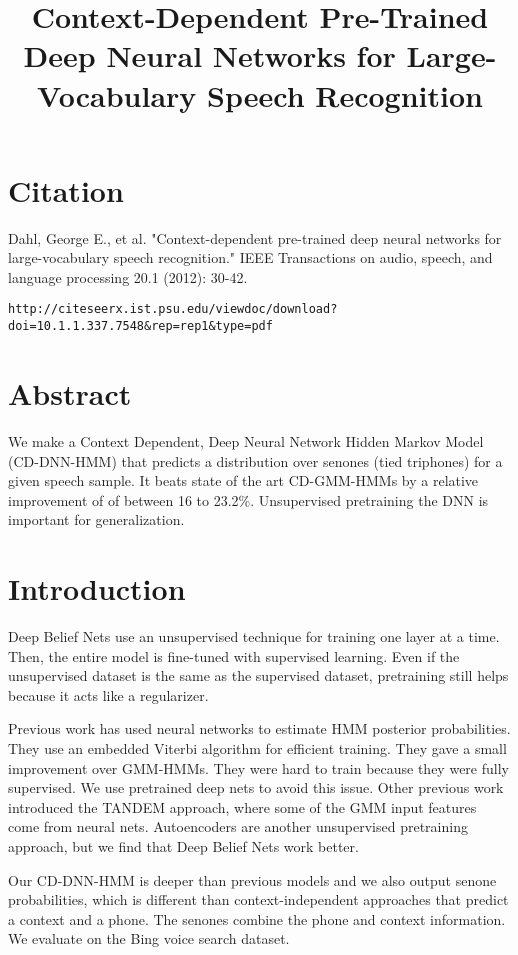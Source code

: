 \documentclass[a4paper]{article}
\title{Context-Dependent Pre-Trained Deep Neural Networks for Large-Vocabulary
Speech Recognition}
\date{}
\begin{document}
\maketitle

\section{Citation}
Dahl, George E., et al. "Context-dependent pre-trained deep neural networks for large-vocabulary speech recognition." IEEE Transactions on audio, speech, and language processing 20.1 (2012): 30-42.

\begin{verbatim}
http://citeseerx.ist.psu.edu/viewdoc/download?doi=10.1.1.337.7548&rep=rep1&type=pdf
\end{verbatim}

\section{Abstract}
We make a Context Dependent, Deep Neural Network Hidden Markov Model 
(CD-DNN-HMM) that predicts a distribution over senones (tied triphones)
for a given speech sample. It beats state of the art CD-GMM-HMMs by a relative
improvement of of between 16 to 23.2\%. Unsupervised pretraining the DNN is
important for generalization.

\section{Introduction}
Deep Belief Nets use an unsupervised technique for training one layer at a time.
Then, the entire model is fine-tuned with supervised learning. Even if the
unsupervised dataset is the same as the supervised dataset, pretraining still
helps because it acts like a regularizer.

Previous work has used neural networks to estimate HMM posterior probabilities.
They use an embedded Viterbi algorithm for efficient training. They gave a small
improvement over GMM-HMMs. They were hard to train because they were fully
supervised. We use pretrained deep nets to avoid this issue. Other previous
work introduced the TANDEM approach, where some of the GMM input features come
from neural nets. Autoencoders are another unsupervised pretraining approach,
but we find that Deep Belief Nets work better.

Our CD-DNN-HMM is deeper than previous models and we also output senone
probabilities, which is different than context-independent approaches that
predict a context and a phone. The senones combine the phone and context
information. We evaluate on the Bing voice search dataset.
\end{document}
